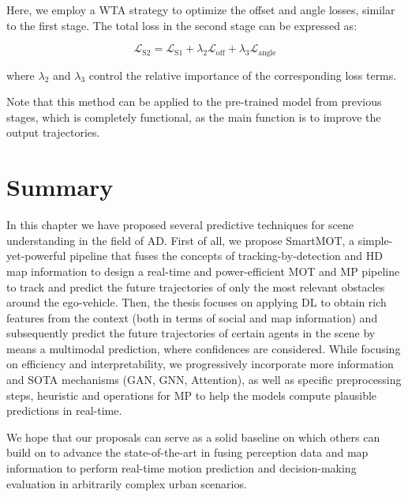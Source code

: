 Here, we employ a WTA strategy to optimize the offset and angle losses, similar to the first stage. The total loss in the second stage can be expressed as: 

\begin{equation}
	\label{eq:s2loss}
	\mathcal{L}_{\text{S2}}=\mathcal{L}_{\text{S1}}+\lambda_{2}\mathcal{L}_{\text{off}}+\lambda_{3}\mathcal{L}_{\text{angle}}
\end{equation}

where $\lambda_{2}$ and $\lambda_{3}$ control the relative importance of the corresponding loss terms.

Note that this method can be applied to the pre-trained model from previous stages, which is completely functional, as the main function is to improve the output trajectories.

\section{Summary}

In this chapter we have proposed several predictive techniques for scene understanding in the field of \ac{AD}. First of all, we propose SmartMOT, a simple-yet-powerful pipeline that fuses the concepts of tracking-by-detection and HD map information to design a real-time and power-efficient \ac{MOT} and \ac{MP} pipeline to track and predict the future trajectories of only the most relevant obstacles around the ego-vehicle. Then, the thesis focuses on applying \ac{DL} to obtain rich features from the context (both in terms of social and map information) and subsequently predict the future trajectories of certain agents in the scene by means a multimodal prediction, where confidences are considered. While focusing on efficiency and interpretability, we progressively incorporate more information and \ac{SOTA} mechanisms (\ac{GAN}, \ac{GNN}, Attention), as well as specific preprocessing steps, heuristic and operations for \ac{MP} to help the models compute plausible predictions in real-time.

We hope that our proposals can serve as a solid baseline on which others can build on to advance the state-of-the-art in fusing perception data and map information to perform real-time motion prediction and decision-making evaluation in arbitrarily complex urban scenarios. 

